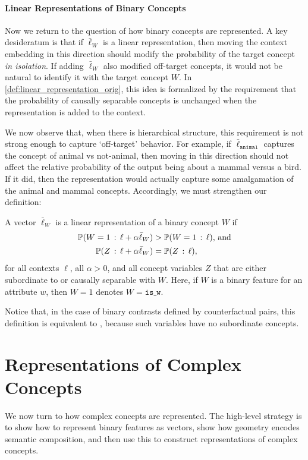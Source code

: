 \documentclass{article}
\newcommand{\ConceptValue}[1]{\texttt{#1}}
\begin{document}
\paragraph{Linear Representations of Binary Concepts}
Now we return to the question of how binary concepts are represented.
A key desideratum is that if $\bar{\ell}_W$ is a linear representation, then moving the context embedding in this direction should modify the probability of the target concept \emph{in isolation}.
If adding $\bar{\ell}_W$ also modified off-target concepts, it would not be natural to identify it with the target concept $W$. In \cref{def:linear_representation_orig}, this idea is formalized by the requirement that the probability of causally separable concepts is unchanged when the representation is added to the context. 

We now observe that, when there is hierarchical structure, this requirement is not strong enough to capture `off-target' behavior. For example, if $\bar{\ell}_{\ConceptValue{animal}}$ captures the concept of animal vs not-animal, then moving in this direction should not affect the relative probability of the output being about a mammal versus a bird. If it did, then the representation would actually capture some amalgamation of the animal and mammal concepts. Accordingly, we must strengthen our definition: 
\begin{definition}\label{def:linear_representation}
    A vector $\bar{\ell}_W$ is a linear representation of a binary concept $W$ if
    \begin{align}
      \Pr(W = 1 \given \ell + \alpha \bar{\ell}_W) &> \Pr(W = 1 \given \ell) \text{, and} \label{eq:linear_cond1} \\
      \Pr(Z \given \ell + \alpha\bar{\ell}_W) &= \Pr(Z \given \ell), \label{eq:linear_cond2}
    \end{align}   
    for all contexts $\ell$, all $\alpha>0$, and all concept variables $Z$ that are either subordinate to or causally separable with $W$.
    Here, if $W$ is a binary feature for an attribute $w$, then $W=1$ denotes $W = \ConceptValue{is\_w}$.
\end{definition}   

Notice that, in the case of binary contrasts defined by counterfactual pairs, this definition is equivalent to , because such variables have no subordinate concepts.



\section{Representations of Complex Concepts}
We now turn to how complex concepts are represented.
The high-level strategy is to show how to represent binary features as vectors, show how geometry encodes semantic composition, and then use this to construct representations of complex concepts.
\end{document}
